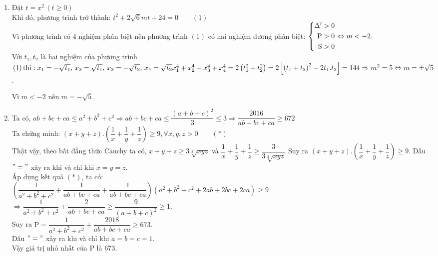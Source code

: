 \begin{ex}
{\begin{enumerate}
     \item Đặt $ t = x^2 \, \left(t \geq 0\right) $\\
     Khi đó, phương trình trở thành: $ t^2 + 2 \sqrt{6}mt + 24 = 0 \qquad \left(1\right) $ \\
     Vì phương trình có 4 nghiệm phân biệt nên phương trình $ \left(1\right)  $ có hai nghiệm dương phân biệt: $ \left\{\begin{aligned}\Delta' > 0 \\ \mathrm{P} > 0 \\ \mathrm{S} > 0\end{aligned}\right. \Leftrightarrow m < -2.  $ \\
     Với $ t_1, t_2 $ là hai nghiệm của phương trình $ \left(1\right) \text{thì}: \\  x_1 = - \sqrt{t_1}, \, x_2 =  \sqrt{t_1}, \, x_3 = - \sqrt{t_2}, \, x_4 =  \sqrt{t_2} \\
     x_1^4 + x_2^4 + x_3^4 + x_4^4 = 2 \left(t_1^2+t_2^2\right) = 2 \left[\left(t_1+t_2\right)^2 - 2t_1.t_2\right] = 144 \Rightarrow m^2 = 5 \Leftrightarrow m = \pm \sqrt{5}$.
     
      Vì $ m < -2 $ nên $ m = - \sqrt{5}. $
     \item Ta có, $ ab + bc + ca \leq a^2 + b^2 + c^2 \Rightarrow ab + bc + ca \leq \dfrac{\left(a+b+c\right)^2}{3} \leq 3  \Rightarrow  \dfrac{2016}{ab+bc+ca} \geq 672$ \\
     Ta chứng minh: $ \left(x + y + z \right).\left(\dfrac{1}{x} + \dfrac{1}{y} + \dfrac{1}{z}\right) \geq 9, \forall x, y, z > 0 \qquad \left(*\right)$\\
     Thật vậy, theo bất đẳng thức Cauchy ta có, $ x + y + z \geq 3 \sqrt[3]{xyz}  $ và $ \dfrac{1}{x} + \dfrac{1}{y} + \dfrac{1}{z} \geq \dfrac{3}{3 \sqrt[3]{xyz}}  $
     Suy ra $ \left(x + y + z \right).\left(\dfrac{1}{x} + \dfrac{1}{y} + \dfrac{1}{z}\right) \geq 9. $ Dấu $ "=" $ xảy ra khi và chỉ khi $ x = y = z. $\\
     Áp dụng kết quả $\left(*\right)$, ta có:\\
     $ \left(\dfrac{1}{a^2+b^2+c^2} + \dfrac{1}{ab+bc+ca} + \dfrac{1}{ab+bc+ca}\right) \left(a^2+b^2+c^2+2ab+2bc+2ca\right) \geq 9 $ \\
$      \Rightarrow \dfrac{1}{a^2+b^2+c^2} + \dfrac{2}{ab+bc+ca} \geq \dfrac{9}{\left(a+b+c\right)^2} \geq 1. $\\
Suy ra $ \mathrm{P} = \dfrac{1}{a^2+b^2+c^2}+ \dfrac{2018}{ab+bc+ca} \geq 673. $ \\
Dấu $ "="  $ xảy ra khi và chỉ khi $ a = b = c = 1. $ \\
Vậy giá trị nhỏ nhất của $ \mathrm{P}  $ là 673.
    \end{enumerate}
    }
\end{ex}

